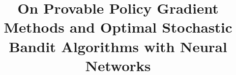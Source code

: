 \documentclass[letterpaper]{article}
\title{On Provable Policy Gradient Methods and Optimal Stochastic Bandit Algorithms with Neural Networks}
\author{} %
\begin{document}
\maketitle

\begin{abstract}

\end{abstract}













{\small


}
\end{document}
